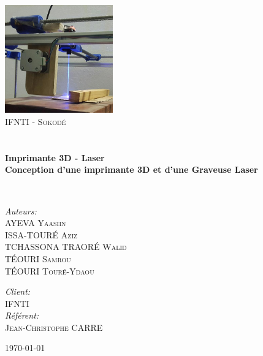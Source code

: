 \begin{titlepage}
\begin{center}

\includegraphics[width=0.35\textwidth]{./logo}~\\[1cm]

\textsc{\LARGE IFNTI - Sokodé}\\[1.5cm]

\textsc{\Large }\\[0.5cm]

\HRule \\[0.4cm]

{\huge \bfseries Imprimante 3D - Laser\\
Conception d'une imprimante 3D et d'une Graveuse Laser \\[0.4cm] }

\HRule \\[1.5cm]

\begin{minipage}{0.4\textwidth}
\begin{flushleft} \large
\emph{Auteurs:}\\
\textsc{AYEVA Yaasiin}\\
\textsc{ISSA-TOURÉ Aziz}\\
\textsc{TCHASSONA TRAORÉ Walid}\\
\textsc{TÉOURI Samrou}\\
\textsc{TÉOURI Touré-Ydaou}
\end{flushleft}
\end{minipage}
\begin{minipage}{0.4\textwidth}
\begin{flushright} \large
\emph{Client:} \\
\textsc{IFNTI}\\
\emph{Référent:} \\
\textsc{Jean-Christophe CARRE}
\end{flushright}
\end{minipage}

\vfill

{\large \today}

\end{center}
\end{titlepage}